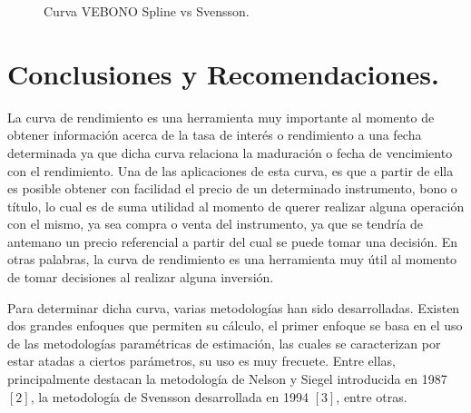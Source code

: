 \begin{figure}[h]
\caption{Curva VEBONO Spline vs Svensson.}
\label{curva_spline_comp_veb}
\end{figure}


\newpage

\section{Conclusiones y Recomendaciones.}

\hspace{0.4cm}La curva de rendimiento es una herramienta muy importante al momento de obtener informaci\'on acerca de la tasa de inter\'es o rendimiento a una fecha determinada ya que dicha curva relaciona la maduraci\'on o fecha de vencimiento con el rendimiento. Una de las aplicaciones de esta curva, es que a partir de ella es posible obtener con facilidad el precio de un determinado instrumento, bono o t\'itulo, lo cual es de suma utilidad al momento de querer realizar alguna operaci\'on con el mismo, ya sea compra o venta del instrumento, ya que se tendr\'ia de antemano un precio referencial a partir del cual se puede tomar una decisi\'on. En otras palabras, la curva de rendimiento es una herramienta muy \'util al momento de tomar decisiones al realizar alguna inversi\'on.



\hspace{0.4cm} Para determinar dicha curva, varias metodolog\'ias han sido desarrolladas. Existen dos grandes enfoques que permiten su c\'alculo, el primer enfoque se basa en el uso de las metodolog\'ias param\'etricas de estimaci\'on, las cuales se caracterizan por estar atadas a ciertos par\'ametros, su uso es muy frecuete. Entre ellas, principalmente destacan la metodolog\'ia de Nelson y Siegel introducida en 1987 $[2]$, la metodolog\'ia de Svensson desarrollada en 1994 $[3]$, entre otras.


